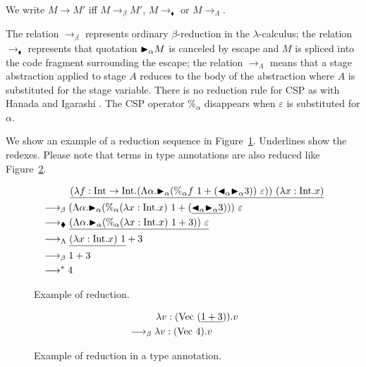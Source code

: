 We write \( M \longrightarrow M' \) iff \( M \longrightarrow_{\beta} M' \), \(
M \longrightarrow_\blacklozenge \) or \( M \longrightarrow_\Lambda \).

The relation $\longrightarrow_\beta$ represents ordinary $\beta$-reduction in
the \(\lambda\)-calculus; the relation $\longrightarrow_\blacklozenge$
represents that quotation ${\mathop{\blacktriangleright}}_\alpha M$ is canceled by escape and $M$ is
spliced into the code fragment surrounding the escape; the relation
$\longrightarrow_\Lambda$ means that a stage abstraction applied to stage $A$
reduces to the body of the abstraction where $A$ is substituted for the stage
variable.  There is no reduction rule for CSP as with Hanada and Igarashi
\cite{HanadaIgarashi2014CSP}.  The CSP operator $\%_\alpha$ disappears when $\varepsilon$
is substituted for $\alpha$.

We show an example of a reduction sequence in
Figure~\ref{fig:example-of-reduction}. Underlines show the redexes.  Please
note that terms in type annotations are also reduced like
Figure~\ref{fig:reduction-in-type-annotations}.

\begin{figure}[tbp]
\begin{align*}
    & \hspace{10mm} \underline{(\lambda f:\I\to\I.(\Lambda\alpha.\TB_\alpha (\%_\alpha f\ 1 + (\TBL_\alpha \TB_\alpha 3))\ \varepsilon))\ (\lambda x:\I.x)} \\
    & \longrightarrow_\beta (\Lambda\alpha.\TB_\alpha (\%_\alpha (\lambda x:\I.x)\ 1 + (\underline{\TBL_\alpha \TB_\alpha 3})))\ \varepsilon        \\
    & \longrightarrow_\blacklozenge \underline{(\Lambda\alpha.\TB_\alpha (\%_\alpha (\lambda x:\I.x)\ 1 + 3))\ \varepsilon}                                         \\
    & \longrightarrow_\Lambda \underline{(\lambda x:\I.x)\ 1} + 3                                                                                           \\
    & \longrightarrow_\beta 1 + 3                                                                                                                           \\
    & \longrightarrow^* 4
\end{align*}
    \caption{Example of reduction.}
    \label{fig:example-of-reduction}
\end{figure}

\begin{figure}[tbp]
    \begin{align*}
        & \hspace{10mm} \lambda v:(\text{Vec }(\underline{1+3})).v \\
        & \longrightarrow_\beta \lambda v:(\text{Vec }4).v
    \end{align*}
    \caption{Example of reduction in a type annotation.}
    \label{fig:reduction-in-type-annotations}
\end{figure}

